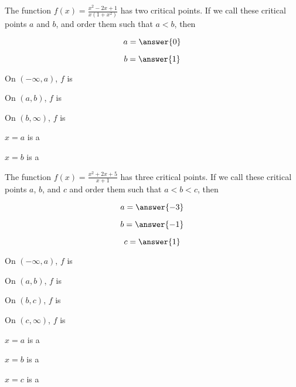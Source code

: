 \documentclass[handout]{ximera}
\begin{document}
\begin{exercise}
The function $f(x) =\frac{x^2-2x+1}{x(1+x^2)}$ has two critical
points.  If we call these critical points $a$ and $b$, and order them
such that $a < b$, then

$$
a = \answer{0}
$$

$$
b=\answer{1}
$$

On $(-\infty,a)$, $f$ is 

On $(a,b)$, $f$ is 

On $(b,\infty)$, $f$ is 


$x=a$ is a 

$x=b$ is a 

\end{exercise}


\begin{exercise}
The function $f(x) =\frac{x^2+2x+5}{x+1}$ has three critical points.
If we call these critical points $a$, $b$, and $c$ and order them such
that $a < b < c$, then

$$
a = \answer{-3}
$$

$$
b=\answer{-1}
$$

$$
c=\answer{1}
$$



On $(-\infty,a)$, $f$ is 

On $(a,b)$, $f$ is 

On $(b,c)$, $f$ is 

On $(c,\infty)$, $f$ is 


$x=a$ is a 

$x=b$ is a 

$x=c$ is a 

\end{exercise}
\end{document}
